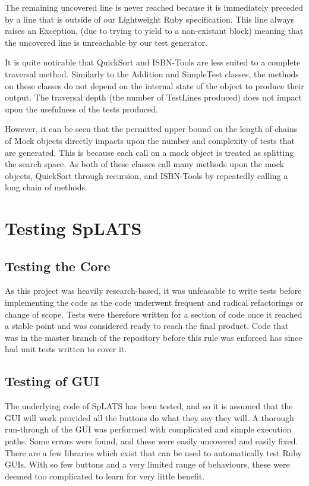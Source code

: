   The remaining uncovered line is never reached because it is immediately preceded by a line that is outside of our Lightweight Ruby specification.
This line always raises an Exception, (due to trying to yield to a non-existant block) meaning that the uncovered line is unreachable by our test generator.

  It is quite noticable that QuickSort and ISBN-Tools are less suited to a complete traversal method.
Similarly to the Addition and SimpleTest classes, the methods on these classes do not depend on the internal state of the object to produce their output.
The traversal depth (the number of TestLines produced) does not impact upon the usefulness of the tests produced.

  However, it can be seen that the permitted upper bound on the length of chains of Mock objects directly impacts upon the number and complexity of tests that are generated.
This is because each call on a mock object is treated as splitting the search space.
As both of these classes call many methods upon the mock objects, QuickSort through recursion, and ISBN-Tools by repeatedly calling a long chain of methods.

\section{Testing SpLATS}
\subsection{Testing the Core}
  As this project was heavily research-based, it was unfeasable to write tests before implementing the code as the code underwent frequent and radical refactorings or change of scope.
  Tests were therefore written for a section of code once it reached a stable point and was considered ready to reach the final product.
  Code that was in the master branch of the repository before this rule was enforced has since had unit tests written to cover it.
    
\subsection{Testing of GUI}
The underlying code of SpLATS has been tested, and so it is assumed that the GUI will work provided all the buttons do what they say they will.
A thorough run-through of the GUI was performed with complicated and simple execution paths. Some errors were found, and these were easily uncovered and easily fixed.
There are a few libraries which exist that can be used to automatically test Ruby GUIs.
With so few buttons and a very limited range of behaviours, these were deemed too complicated to learn for very little benefit.
